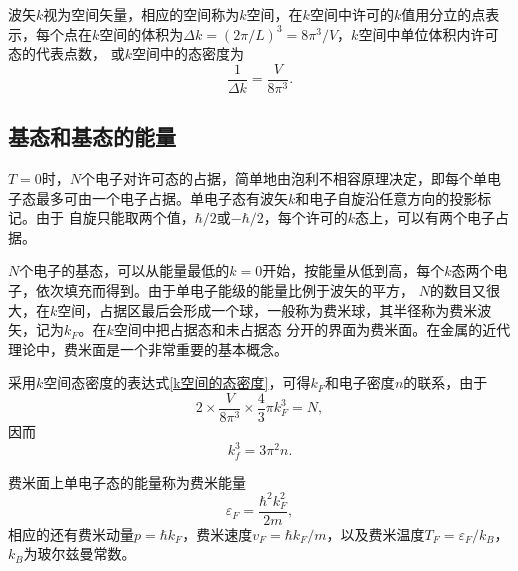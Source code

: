         波矢$k$视为空间矢量，相应的空间称为$k$空间，在$k$空间中许可的$k$值用分立的点表示，每个点在$k$空间的体积为$\Delta k=(2\pi/L)^3=8\pi^3/V$，$k$空间中单位体积内许可态的代表点数，
        或$k$空间中的态密度为
        \begin{equation}
            \frac{1}{\Delta k}=\frac{V}{8\pi^3}\label{k空间的态密度}.
        \end{equation}
    \subsection{基态和基态的能量}\label{subsection:基态和基态的能量}
        $T=0$时，$N$个电子对许可态的占据，简单地由{泡利不相容原理}决定，即每个单电子态最多可由一个电子占据。单电子态有波矢$k$和电子自旋沿任意方向的投影标记。由于
        自旋只能取两个值，$\hbar/2$或$-\hbar/2$，每个许可的$k$态上，可以有两个电子占据。

        $N$个电子的基态，可以从能量最低的$k=0$开始，按能量从低到高，每个$k$态两个电子，依次填充而得到。由于单电子能级的能量比例于波矢的平方，
        $N$的数目又很大，在$k$空间，占据区最后会形成一个球，一般称为{费米球}，其半径称为{费米波矢}，记为$k_F$。在$k$空间中把占据态和未占据态
        分开的界面为{费米面}。在金属的近代理论中，费米面是一个非常重要的基本概念。

        采用$k$空间态密度的表达式\autoref{k空间的态密度}，可得$k_F$和电子密度$n$的联系，由于
        \begin{equation}
            2\times\frac{V}{8\pi^3}\times\frac{4}{3}\pi k_F^3=N,
        \end{equation}
        因而
        \begin{equation}
            k_f^3=3\pi^2n\label{费米波矢与电子密度关系}.
        \end{equation}

        费米面上单电子态的能量称为{费米能量}
        \begin{equation}
            \varepsilon_F=\frac{\hbar^2k_F^2}{2m}\label{费米能量},
        \end{equation}
        相应的还有{费米动量}$p=\hbar k_F$，{费米速度}$v_F=\hbar k_F/m$，以及{费米温度}$T_F=\varepsilon_F/k_B$，$k_B$为玻尔兹曼常数。

